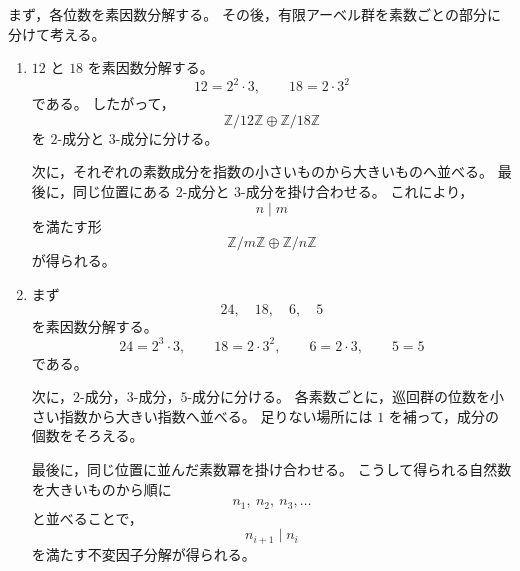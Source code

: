 \begin{strategy}
	まず，各位数を素因数分解する。
	その後，有限アーベル群を素数ごとの部分に分けて考える。
	
	\begin{enumerate}
		\item[(1)]
		\(12\) と \(18\) を素因数分解する。
		\[
		12=2^2\cdot 3,
		\qquad
		18=2\cdot 3^2
		\]
		である。
		したがって，
		\[
		\mathbb{Z}/12\mathbb{Z}
		\oplus
		\mathbb{Z}/18\mathbb{Z}
		\]
		を \(2\)-成分と \(3\)-成分に分ける。
		
		次に，それぞれの素数成分を指数の小さいものから大きいものへ並べる。
		最後に，同じ位置にある \(2\)-成分と \(3\)-成分を掛け合わせる。
		これにより，
		\[
		n\mid m
		\]
		を満たす形
		\[
		\mathbb{Z}/m\mathbb{Z}
		\oplus
		\mathbb{Z}/n\mathbb{Z}
		\]
		が得られる。
		
		\item[(2)]
		まず
		\[
		24,\quad 18,\quad 6,\quad 5
		\]
		を素因数分解する。
		\[
		24=2^3\cdot 3,
		\qquad
		18=2\cdot 3^2,
		\qquad
		6=2\cdot 3,
		\qquad
		5=5
		\]
		である。
		
		次に，\(2\)-成分，\(3\)-成分，\(5\)-成分に分ける。
		各素数ごとに，巡回群の位数を小さい指数から大きい指数へ並べる。
		足りない場所には \(1\) を補って，成分の個数をそろえる。
		
		最後に，同じ位置に並んだ素数冪を掛け合わせる。
		こうして得られる自然数を大きいものから順に
		\[
		n_1,\ n_2,\ n_3,\ldots
		\]
		と並べることで，
		\[
		n_{i+1}\mid n_i
		\]
		を満たす不変因子分解が得られる。
	\end{enumerate}
\end{strategy}